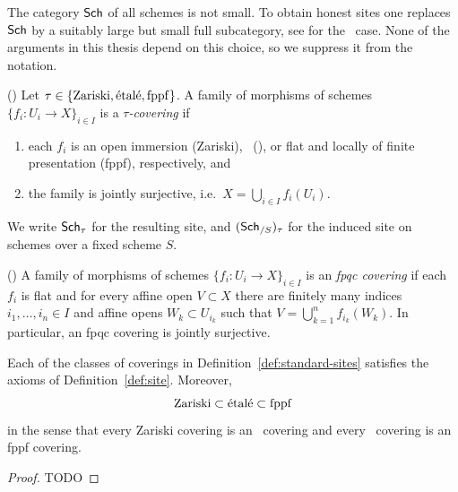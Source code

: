 \begin{remark}\label{rem:set-theory-sites}
	The category $\mathsf{Sch}$ of all schemes is not small. To obtain honest sites one replaces $\mathsf{Sch}$ by a suitably large but small full subcategory, see \cite[][Tag 021A]{stacks-project} for the \etale\ case. None of the arguments in this thesis depend on this choice, so we suppress it from the notation.
\end{remark}


\begin{definition}\label{def:standard-sites}
	(\cite[][Tags 020N, 0215, 021M]{stacks-project})
	Let $\tau \in \{\mathrm{Zariski}, \text{\'etal\'e}, \mathrm{fppf}\}$. A family of morphisms of schemes $\{f_i:U_i \to X\}_{i\in I}$ is a \emph{$\tau$-covering} if
	\begin{enumerate}
		\item each $f_i$ is an open immersion (Zariski), \etale\ (\etale), or flat and locally of finite presentation (fppf), respectively, and
		\item the family is jointly surjective, i.e.\ $X=\bigcup_{i\in I} f_i(U_i)$.
	\end{enumerate}
	We write $\mathsf{Sch}_\tau$ for the resulting site, and $(\mathsf{Sch}_{/S})_\tau$ for the induced site on schemes over a fixed scheme $S$.
\end{definition}

\begin{definition}\label{def:fpqc-covering}
	(\cite[][Tag 022B]{stacks-project})
	A family of morphisms of schemes $\{f_i:U_i\to X\}_{i\in I}$ is an \emph{fpqc covering} if each $f_i$ is flat and for every affine open $V\subset X$ there are finitely many indices $i_1,\dots,i_n\in I$ and affine opens $W_k\subset U_{i_k}$ such that $V=\bigcup_{k=1}^n f_{i_k}(W_k)$.
	In particular, an fpqc covering is jointly surjective.
\end{definition}

\begin{proposition}\label{prop:gross-topology-chain}
	Each of the classes of coverings in Definition~\ref{def:standard-sites} satisfies the axioms of Definition~\ref{def:site}. Moreover,
	\[
	\mathrm{Zariski} \subset \text{\'etal\'e} \subset \mathrm{fppf}
	\]
	in the sense that every Zariski covering is an \etale\ covering and every \etale\ covering is an fppf covering.
\end{proposition}

\begin{proof}
	TODO
\end{proof}


